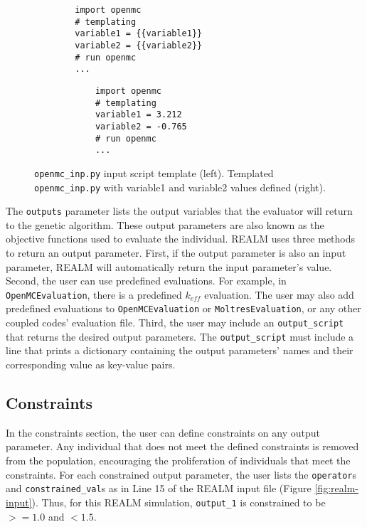 \begin{figure}[]
    \begin{minipage}{0.4\textwidth}
        \centering
    \begin{verbatim}
        import openmc 
        # templating 
        variable1 = {{variable1}}
        variable2 = {{variable2}}
        # run openmc 
        ... 
    \end{verbatim}
    \end{minipage}
    \hspace{2cm}
    \begin{minipage}{0.4\textwidth}
        \centering
        \begin{verbatim}
            import openmc 
            # templating 
            variable1 = 3.212
            variable2 = -0.765
            # run openmc 
            ... 
        \end{verbatim}
        \end{minipage}
    \caption{\texttt{openmc\_inp.py} input script template (left). 
             Templated \texttt{openmc\_inp.py} with variable1 and variable2 
             values defined (right).}
    \label{fig:openmcinp.py}
\end{figure}

The \texttt{outputs} parameter lists the output variables that the evaluator 
will return to the genetic algorithm. 
These output parameters are also known as the objective functions used to 
evaluate the individual.  
\gls{REALM} uses three methods to return an output parameter. 
First, if the output parameter is also an input parameter, REALM will automatically 
return the input parameter's value. 
Second, the user can use predefined evaluations. 
For example, in \texttt{OpenMCEvaluation}, there is a predefined $k_{eff}$ 
evaluation.
The user may also add predefined evaluations to \texttt{OpenMCEvaluation} or 
\texttt{MoltresEvaluation}, or any other coupled codes' evaluation file.
Third, the user may include an \texttt{output\_script} that returns the desired 
output parameters. 
The \texttt{output\_script} must include a line that prints a dictionary containing 
the output parameters' names and their corresponding value as key-value pairs. 

\subsection{Constraints}
In the constraints section, the user can define constraints on any output parameter. 
Any individual that does not meet the defined constraints is removed from the 
population, encouraging the proliferation of individuals that meet the 
constraints. 
For each constrained output parameter, the user lists the \texttt{operator}s 
and \texttt{constrained\_val}s as in Line 15 of the REALM input file 
(Figure \ref{fig:realm-input}). 
Thus, for this REALM simulation, \texttt{output\_1} is constrained to be 
$>= 1.0$ and $< 1.5$. 

